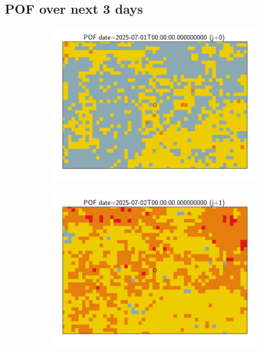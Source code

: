 \documentclass{article}
\begin{document}
\subsection*{POF over next 3 days}
\vspace{-1em}
\begin{figure}[H]
    \centering
    \begin{subfigure}[b]{0.31\textwidth}
        \centering
        \includegraphics[width=\linewidth]{pof_376_j0.png} %
    \end{subfigure}
    \begin{subfigure}[b]{0.31\textwidth}
        \centering
        \includegraphics[width=\linewidth]{pof_376_j1.png} %

\end{subfigure}
\end{figure}
\end{document}
